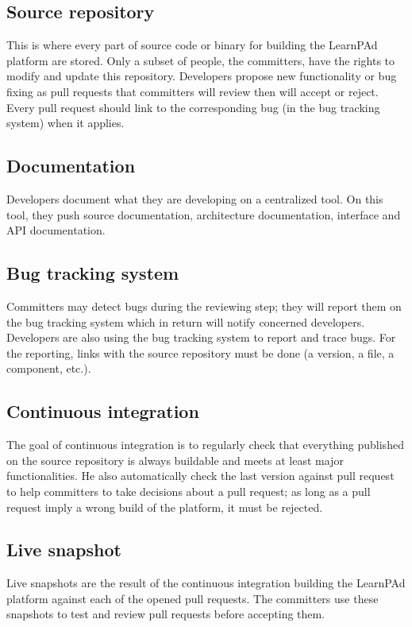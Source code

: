\subsection{Source repository}
\label{sec:source-repository}

This is where every part of source code or binary for building the LearnPAd platform are stored.  Only a subset of people, the committers, have the rights to modify and update this repository.  Developers propose new functionality or bug fixing as pull requests that committers will review then will accept or reject.  Every pull request should link to the corresponding bug (in the bug tracking system) when it applies.

\subsection{Documentation}
\label{sec:documentation}

Developers document what they are developing on a centralized tool.  On this tool, they push source documentation, architecture documentation, interface and API documentation.

\subsection{Bug tracking system}
\label{sec:bug tracking-system}

Committers may detect bugs during the reviewing step; they will report them on the bug tracking system which in return will notify concerned developers.  Developers are also using the bug tracking system to report and trace bugs.  For the reporting, links with the source repository must be done (a version, a file, a component, etc.).

\subsection{Continuous integration}
\label{sec:continuous-integration}

The goal of continuous integration is to regularly check that everything published on the source repository is always buildable and meets at least major functionalities.  He also automatically check the last version against pull request to help committers to take decisions about a pull request; as long as a pull request imply a wrong build of the platform, it must be rejected.

\subsection{Live snapshot}
\label{sec:live-snapshot}

Live snapshots are the result of the continuous integration building the LearnPAd platform against each of the opened pull requests.  The committers use these snapshots to test and review pull requests before accepting them.
